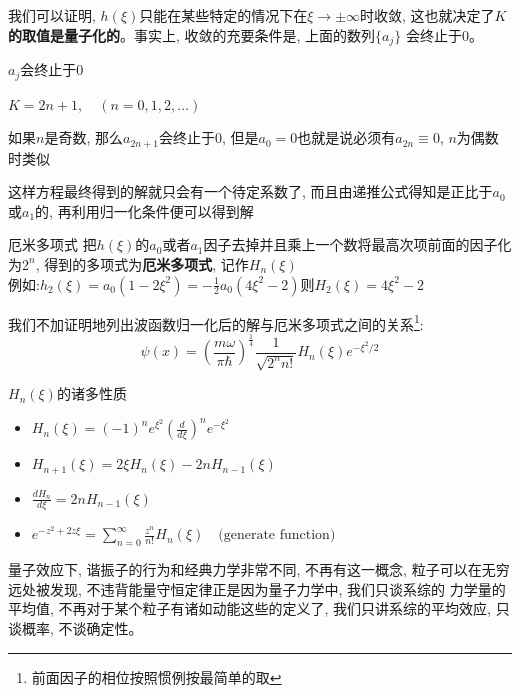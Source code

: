 \documentclass[a4paper,zihao=-4,linespread=1]{ctexrep}
\newenvironment{lequation}{\large\begin{equation}}{\end{equation}}
\begin{document}
    我们可以证明, $h(\xi)$只能在某些特定的情况下在$\xi \to \pm \infty$时收敛, 这也就决定了\textbf{$K$的取值是量子化的}。事实上, 收敛的充要条件是, 上面的数列$\{a_j\}$
    会终止于$0$。
    \begin{proposition}{$a_j$会终止于$0$}
        \begin{center}
            \begin{math}
            \displaystyle
            K=2n+1,\quad (n=0,1,2,\ldots)
            \end{math}
        \end{center}
        如果$n$是奇数, 那么$a_{2n+1}$会终止于$0$, 但是$a_0=0$也就是说必须有$a_{2n}\equiv 0$, $n$为偶数时类似
    \end{proposition}
    这样方程最终得到的解就只会有一个待定系数了, 而且由递推公式得知是正比于$a_0$或$a_1$的, 再利用归一化条件便可以得到解
    \begin{define}{厄米多项式}
        把$h(\xi)$的$a_0$或者$a_1$因子去掉并且乘上一个数将最高次项前面的因子化为$2^n$, 得到的多项式为\textbf{厄米多项式}, 记作$H_n(\xi)$\\
        例如:$h_2(\xi)=a_0(1-2\xi^2)=-\frac{1}{2}a_0(4\xi^2-2)$则$H_2(\xi)=4\xi^2-2$
    \end{define}
    我们不加证明地列出波函数归一化后的解与厄米多项式之间的关系\footnote[1]{前面因子的相位按照惯例按最简单的取}:
    \begin{lequation}
        \boxed{
            \psi(x)=\left(\frac{m\omega}{\pi\hbar}\right)^{\frac{1}{4}}\frac{1}{\sqrt{2^nn!}}H_n(\xi)e^{-\xi^2/2}
        }
    \end{lequation}
    \begin{theorem}{$H_n(\xi)$的诸多性质}
        \begin{itemize}
            \item 
                \begin{math}
                    \displaystyle
                    H_n(\xi)=(-1)^ne^{\xi^2}\left(\frac{d}{d\xi}\right)^ne^{-\xi^2}
                \end{math}
            \item 
                \begin{math}
                    \displaystyle
                    H_{n+1}(\xi)=2\xi H_n(\xi)-2nH_{n-1}(\xi)
                \end{math}
            \item 
                \begin{math}
                    \displaystyle
                    \frac{d H_n}{d\xi}=2n H_{n-1}(\xi)
                \end{math}
            \item 
                \begin{math}
                    \displaystyle
                    e^{-z^2+2z\xi}=\sum_{n=0}^{\infty}\frac{z^n}{n!}H_n(\xi)\quad\text{(generate function)}
                \end{math}
        \end{itemize}
    \end{theorem}
    量子效应下, 谐振子的行为和经典力学非常不同, 不再有这一概念, 粒子可以在无穷远处被发现, 不违背能量守恒定律正是因为量子力学中, 我们只谈系综的
    力学量的平均值, 不再对于某个粒子有诸如动能这些的定义了, 我们只讲系综的平均效应, 只谈概率, 不谈确定性。
\end{document}
